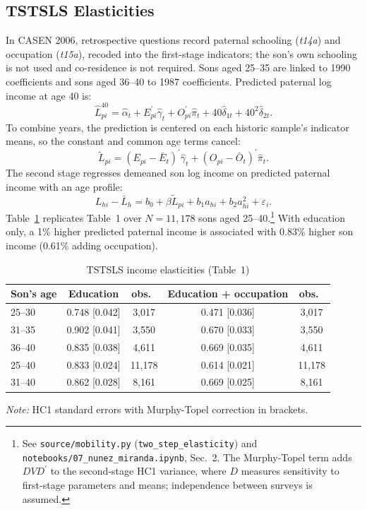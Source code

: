 \subsection{TSTSLS Elasticities}\label{sec:tsts}
In CASEN 2006, retrospective questions record paternal schooling (\textit{t14a}) and occupation (\textit{t15a}), recoded into the first-stage indicators; the son's own schooling is not used and co-residence is not required. Sons aged 25--35 are linked to 1990 coefficients and sons aged 36--40 to 1987 coefficients. Predicted paternal log income at age 40 is:
\begin{equation}
    \widehat{L}^{40}_{pi} = \widehat{\alpha}_t + E_{pi}^{\prime}\widehat{\gamma}_t + O_{pi}^{\prime}\widehat{\pi}_t + 40\widehat{\delta}_{1t} + 40^2\widehat{\delta}_{2t}.
    \label{eq:pred-father}
\end{equation}
To combine years, the prediction is centered on each historic sample's indicator means, so the constant and common age terms cancel:
\begin{equation}
    \widetilde{L}_{pi} = (E_{pi}-\bar{E}_t)^{\prime}\widehat{\gamma}_t + (O_{pi}-\bar{O}_t)^{\prime}\widehat{\pi}_t.
    \label{eq:centered}
\end{equation}
The second stage regresses demeaned son log income on predicted paternal income with an age profile:
\begin{equation}
    L_{hi}-\bar{L}_h = b_0 + \beta\widetilde{L}_{pi} + b_1a_{hi} + b_2a_{hi}^2 + \varepsilon_i.
    \label{eq:second}
\end{equation}
Table~\ref{tab:mob-1} replicates Table~1 over $N=11{,}178$ sons aged 25--40.\footnote{See \texttt{source/mobility.py} (\texttt{two\_step\_elasticity}) and \texttt{notebooks/07\_nunez\_miranda.ipynb}, Sec.~2. The Murphy-Topel term adds $DVD^{\prime}$ to the second-stage HC1 variance, where $D$ measures sensitivity to first-stage parameters and means; independence between surveys is assumed.} With education only, a 1\% higher predicted paternal income is associated with 0.83\% higher son income (0.61\% adding occupation).

\begin{table}[H]
    \centering
    \caption{TSTSLS income elasticities (Table~1)}\label{tab:mob-1}
    \begin{tabular}{lcccc}
        \toprule
        Son's age & Education & obs.\ & Education + occupation & obs.\ \\
        \midrule
        25--30 & 0.748 [0.042] & 3,017 & 0.471 [0.036] & 3,017 \\
        31--35 & 0.902 [0.041] & 3,550 & 0.670 [0.033] & 3,550 \\
        36--40 & 0.835 [0.038] & 4,611 & 0.669 [0.035] & 4,611 \\
        25--40 & 0.833 [0.024] & 11,178 & 0.614 [0.021] & 11,178 \\
        31--40 & 0.862 [0.028] & 8,161 & 0.669 [0.025] & 8,161 \\
        \bottomrule
    \end{tabular}
    \vspace{0.2em}
    \flushleft\footnotesize{\textit{Note:} HC1 standard errors with Murphy-Topel correction in brackets.}
\end{table}

